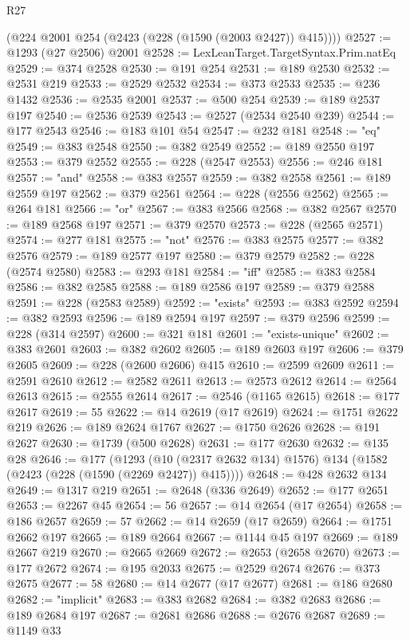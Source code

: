 \begin{lexlean}{R27}
\begin{coremodule}
      (@224 @2001 @254 (@2423 (@228 (@1590 (@2003 @2427)) @415))))
@2527 := @1293 (@27 @2506) @2001
@2528 := LexLeanTarget.TargetSyntax.Prim.natEq
@2529 := @374 @2528
@2530 := @191 @254
@2531 := @189 @2530
@2532 := @2531 @219
@2533 := @2529 @2532
@2534 := @373 @2533
@2535 := @236 @1432
@2536 := @2535 @2001
@2537 := @500 @254
@2539 := @189 @2537 @197
@2540 := @2536 @2539
@2543 := @2527 (@2534 @2540 @239)
@2544 := @177 @2543
@2546 := @183 @101 @54
@2547 := @232 @181
@2548 := "eq"
@2549 := @383 @2548
@2550 := @382 @2549
@2552 := @189 @2550 @197
@2553 := @379 @2552
@2555 := @228 (@2547 @2553)
@2556 := @246 @181
@2557 := "and"
@2558 := @383 @2557
@2559 := @382 @2558
@2561 := @189 @2559 @197
@2562 := @379 @2561
@2564 := @228 (@2556 @2562)
@2565 := @264 @181
@2566 := "or"
@2567 := @383 @2566
@2568 := @382 @2567
@2570 := @189 @2568 @197
@2571 := @379 @2570
@2573 := @228 (@2565 @2571)
@2574 := @277 @181
@2575 := "not"
@2576 := @383 @2575
@2577 := @382 @2576
@2579 := @189 @2577 @197
@2580 := @379 @2579
@2582 := @228 (@2574 @2580)
@2583 := @293 @181
@2584 := "iff"
@2585 := @383 @2584
@2586 := @382 @2585
@2588 := @189 @2586 @197
@2589 := @379 @2588
@2591 := @228 (@2583 @2589)
@2592 := "exists"
@2593 := @383 @2592
@2594 := @382 @2593
@2596 := @189 @2594 @197
@2597 := @379 @2596
@2599 := @228 (@314 @2597)
@2600 := @321 @181
@2601 := "exists-unique"
@2602 := @383 @2601
@2603 := @382 @2602
@2605 := @189 @2603 @197
@2606 := @379 @2605
@2609 := @228 (@2600 @2606) @415
@2610 := @2599 @2609
@2611 := @2591 @2610
@2612 := @2582 @2611
@2613 := @2573 @2612
@2614 := @2564 @2613
@2615 := @2555 @2614
@2617 := @2546 (@1165 @2615)
@2618 := @177 @2617
@2619 := 55
@2622 := @14 @2619 (@17 @2619)
@2624 := @1751 @2622 @219
@2626 := @189 @2624 @1767
@2627 := @1750 @2626
@2628 := @191 @2627
@2630 := @1739 (@500 @2628)
@2631 := @177 @2630
@2632 := @135 @28
@2646 := @177
    (@1293 (@10 (@2317 @2632 @134) @1576) @134 (@1582 (@2423 (@228 (@1590 (@2269 @2427)) @415))))
@2648 := @428 @2632 @134
@2649 := @1317 @219
@2651 := @2648 (@336 @2649)
@2652 := @177 @2651
@2653 := @2267 @45
@2654 := 56
@2657 := @14 @2654 (@17 @2654)
@2658 := @186 @2657
@2659 := 57
@2662 := @14 @2659 (@17 @2659)
@2664 := @1751 @2662 @197
@2665 := @189 @2664
@2667 := @1144 @45 @197
@2669 := @189 @2667 @219
@2670 := @2665 @2669
@2672 := @2653 (@2658 @2670)
@2673 := @177 @2672
@2674 := @195 @2033
@2675 := @2529 @2674
@2676 := @373 @2675
@2677 := 58
@2680 := @14 @2677 (@17 @2677)
@2681 := @186 @2680
@2682 := "implicit"
@2683 := @383 @2682
@2684 := @382 @2683
@2686 := @189 @2684 @197
@2687 := @2681 @2686
@2688 := @2676 @2687
@2689 := @1149 @33

\end{coremodule}
\end{lexlean}

